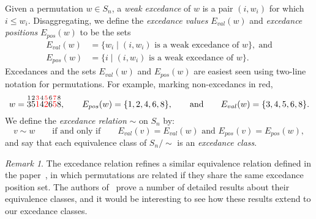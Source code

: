 \documentclass[12pt]{amsart}
\theoremstyle{definition}
\theoremstyle{remark}
\newtheorem{rem}[equation]{Remark}
\numberwithin{equation}{section}
\newcommand{\EP}{E_{pos}}
\newcommand{\EV}{E_{val}}
\begin{document}
Given a permutation $w \in S_{n}$, a \emph{weak excedance} of $w$ is a pair $(i, w_{i})$ for which $i \le w_{i}$.  Disaggregating, we define the \emph{excedance values} $\EV(w)$ and \emph{excedance positions} $\EP(w)$ to be the sets
\begin{align*}
\EV(w) &= \{ w_{i} \;|\; \text{$(i, w_{i})$ is a weak excedance of $w$}\},\;\text{and} \\[0.5em]
\EP(w) &= \{ i  \;|\; \text{$(i, w_{i})$ is a weak excedance of $w$}\}.
\end{align*}
Excedances and the sets $\EV(w)$ and $\EP(w)$ are easiest seen using two-line notation for permutations.  For example, marking non-excedancs in red,
\[
w = \overset{1}{3} \overset{2}{5} {\color{red} \overset{3}{1}} \overset{4}{4} {\color{red} \overset{5}{2}} \overset{6}{6} {\color{red} \overset{7}{5}} \overset{8}{8},
\qquad
\EP(w) = \{1, 2, 4, 6, 8\},\qquad\text{and}\qquad
\EV(w) = \{3, 4, 5, 6, 8\}.
\]
We define the \emph{excedance relation} $\sim$ on $S_{n}$ by:
\begin{equation}
\label{eq:excednacerel}
v \sim w \qquad\text{if and only if} \qquad \text{$\EV(v) = \EV(w)$ and $\EP(v) = \EP(w)$},
\end{equation}
and say that each equivalence class of $S_{n}/\sim$ is an \emph{excedance class}.

\begin{rem}
The excedance relation refines a similar equivalence relation defined in the paper~\cite{ES}, in which permutations are related if they share the same excedance position set.  
The authors of~\cite{ES} prove a number of detailed results about their equivalence classes, and it would be interesting to see how these results extend to our excedance classes.  
\end{rem}
\end{document}
